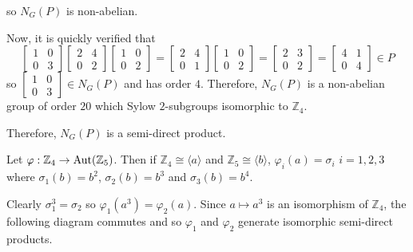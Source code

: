 \documentclass[12pt]{Qual}
\begin{document}
\begin{solution}
\begin{enumerate}[label=(\alph*)]
    so $N_G(P)$ is non-abelian.

    Now, it is quickly verified that $$\begin{bmatrix}
    1 & 0\\
    0 & 3
    \end{bmatrix}\begin{bmatrix}
    2 & 4\\
    0 & 2
    \end{bmatrix}\begin{bmatrix}
    1 & 0\\
    0 & 2
    \end{bmatrix}=\begin{bmatrix}
    2 & 4\\
    0 & 1
    \end{bmatrix}\begin{bmatrix}
    1 & 0\\
    0 & 2
    \end{bmatrix}=\begin{bmatrix}
    2 & 3\\
    0 & 2
    \end{bmatrix}=\begin{bmatrix}
    4 & 1\\
    0 & 4
    \end{bmatrix}\in P$$ so $\begin{bmatrix}
    1 & 0\\
    0 & 3
    \end{bmatrix}\in N_G(P)$ and has order $4$. Therefore, $N_G(P)$ is a non-abelian group of order $20$ which Sylow $2$-subgroups isomorphic to $\mathbb{Z}_4$.

    Therefore, $N_G(P)$ is a semi-direct product.

    Let $\varphi:\mathbb{Z}_4\to\text{Aut}(\mathbb{Z}_5)$. Then if $\mathbb{Z}_4\cong\langle a\rangle$ and $\mathbb{Z}_5\cong\langle b\rangle$, $\varphi_i(a)=\sigma_i$ $i=1,2,3$ where $\sigma_1(b)=b^2$, $\sigma_2(b)=b^3$ and $\sigma_3(b)=b^4$.

    Clearly $\sigma_1^3=\sigma_2$ so $\varphi_1(a^3)=\varphi_2(a)$. Since $a\mapsto a^3$ is an isomorphism of $\mathbb{Z}_4$, the following diagram commutes and so $\varphi_1$ and $\varphi_2$ generate isomorphic semi-direct products.
    \begin{center}
    \end{center}


\end{enumerate}
\end{solution}
\end{document}
